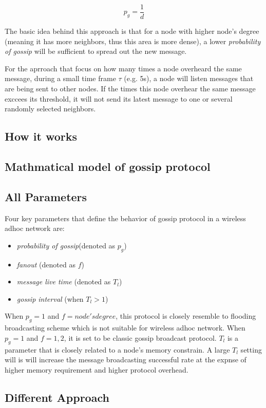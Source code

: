 \[ p_g = \frac{1}{d}\]

The basic idea behind this approach is that for a node with higher node's degree (meaning it has more neighbors, thus this area is more dense), a lower \emph{probability of gossip} will be sufficient to spread out the new message.

For the aprroach that focus on how many times a node overheard the same message, during a small time frame $\tau$ (e.g. 5s), a node will listen messages that are being sent to other nodes. If the times this node overhear the same message exccees its threshold, it will not send its latest message to one or several randomly selected neighbors. 

\subsection{How it works}

\subsection{Mathmatical model of gossip protocol}

\subsection{All Parameters}
Four key parameters that define the behavior of gossip protocol in a wireless adhoc network are: 

\begin{itemize}
	\item \emph{probability of gossip}(denoted as $p_g$)
	\item \emph{fanout} (denoted as $f$)
	\item \emph{message live time} (denoted as $T_l$)
	\item \emph{gossip interval} (when $T_l > 1$)
\end{itemize}

When $p_g = 1$ and $f = node's degree$, this protocol is closely resemble to flooding broadcasting scheme which is not suitable for wireless adhoc network. When $p_g = 1$ and $f = 1, 2$, it is set to be classic gossip broadcast protocol. $T_l$ is a parameter that is closely related to a node's memory constrain. A large $T_l$ setting will is will increase the message broadcasting successful rate at the expnse of higher memory requirement and higher protocol overhead. 

\subsection{Different Approach}

